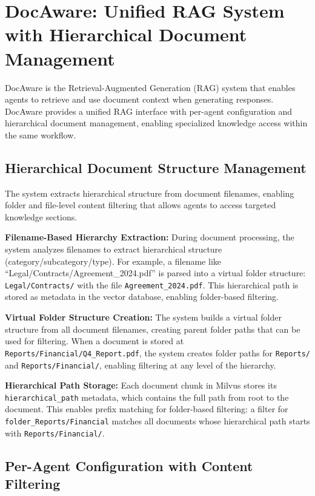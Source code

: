 \documentclass[11pt]{article}
\begin{document}
\section{DocAware: Unified RAG System with Hierarchical Document Management}

DocAware is the Retrieval-Augmented Generation (RAG) system that enables agents to retrieve and use document context when generating responses. DocAware provides a unified RAG interface with per-agent configuration and hierarchical document management, enabling specialized knowledge access within the same workflow.

\subsection{Hierarchical Document Structure Management}

The system extracts hierarchical structure from document filenames, enabling folder and file-level content filtering that allows agents to access targeted knowledge sections.

\textbf{Filename-Based Hierarchy Extraction:} During document processing, the system analyzes filenames to extract hierarchical structure (category/subcategory/type). For example, a filename like ``Legal/Contracts/Agreement\_2024.pdf'' is parsed into a virtual folder structure: \texttt{Legal/Contracts/} with the file \texttt{Agreement\_2024.pdf}. This hierarchical path is stored as metadata in the vector database, enabling folder-based filtering.

\textbf{Virtual Folder Structure Creation:} The system builds a virtual folder structure from all document filenames, creating parent folder paths that can be used for filtering. When a document is stored at \texttt{Reports/Financial/Q4\_Report.pdf}, the system creates folder paths for \texttt{Reports/} and \texttt{Reports/Financial/}, enabling filtering at any level of the hierarchy.

\textbf{Hierarchical Path Storage:} Each document chunk in Milvus stores its \texttt{hierarchical\_path} metadata, which contains the full path from root to the document. This enables prefix matching for folder-based filtering: a filter for \texttt{folder\_Reports/Financial} matches all documents whose hierarchical path starts with \texttt{Reports/Financial/}.

\subsection{Per-Agent Configuration with Content Filtering}
\end{document}

